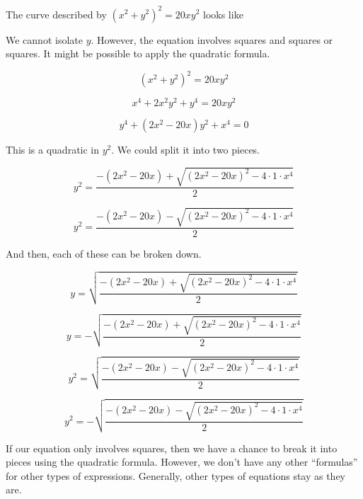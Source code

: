 \documentclass{ximera}
\begin{document}
\begin{example}


The curve described by $(x^2 + y^2)^2 = 20 x y^2$ looks like



\begin{center}
\end{center}


We cannot isolate $y$.  However, the equation involves squares and squares or squares.  It might be possible to apply the quadratic formula.


\[ (x^2 + y^2)^2 = 20 x y^2  \]

\[ x^4 + 2 x^2 y^2 + y^4 = 20 x y^2  \]

\[ y^4 + (2 x^2 - 20 x) y^2 + x^4 = 0 \]




This is a quadratic in $y^2$.  We could split it into two pieces.  



\[ y^2 = \frac{-(2 x^2 - 20 x) + \sqrt{(2x^2-20x)^2 - 4 \cdot 1 \cdot x^4}}{2}   \]


\[ y^2 = \frac{-(2 x^2 - 20 x) - \sqrt{(2x^2-20x)^2 - 4 \cdot 1 \cdot x^4}}{2}   \]



And then, each of these can be broken down.




\[ y = \sqrt{\frac{-(2 x^2 - 20 x) + \sqrt{(2x^2-20x)^2 - 4 \cdot 1 \cdot x^4}}{2}}   \]


\[ y = -\sqrt{\frac{-(2 x^2 - 20 x) + \sqrt{(2x^2-20x)^2 - 4 \cdot 1 \cdot x^4}}{2}}   \]



\[ y^2 = \sqrt{\frac{-(2 x^2 - 20 x) - \sqrt{(2x^2-20x)^2 - 4 \cdot 1 \cdot x^4}}{2}}   \]


\[ y^2 = -\sqrt{\frac{-(2 x^2 - 20 x) - \sqrt{(2x^2-20x)^2 - 4 \cdot 1 \cdot x^4}}{2}}   \]





\begin{center}
\end{center}


If our equation only involves squares, then we have a chance to break it into pieces using the quadratic formula.  However, we don't have any other ``formulas'' for other types of expressions.  Generally, other types of equations stay as they are.


\end{example}
\end{document}
